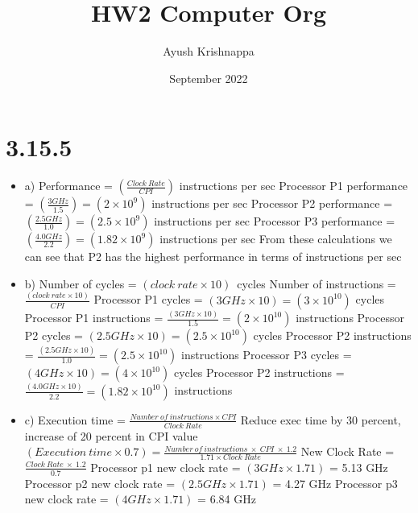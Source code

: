 \documentclass{article}
\title{HW2 Computer Org}
\author{Ayush Krishnappa}
\date{September 2022}
\begin{document}
\maketitle

\section{3.15.5}
\begin{itemize}
  \item a) Performance = $(\frac{Clock\ Rate}{CPI})$ instructions per sec\newline
  Processor P1 performance = $(\frac{3GHz}{1.5}) = (2 \times 10^9)$ instructions per sec\newline
  Processor P2 performance = $(\frac{2.5GHz}{1.0}) = (2.5 \times 10^9)$ instructions per sec\newline
  Processor P3 performance = $(\frac{4.0GHz}{2.2}) = (1.82 \times 10^9)$ instructions per sec\newline
  From these calculations we can see that P2 has the highest performance in terms of instructions per sec
  
  \item b) Number of cycles = $(clock\ rate \times 10)$\ cycles\newline
  Number of instructions = $\frac{(clock\ rate \times 10)}{CPI}$\newline
  Processor P1 cycles = $(3GHz \times 10) = (3 \times 10^{10})$ cycles\newline
  Processor P1 instructions = $\frac{(3GHz \times 10)}{1.5} = (2 \times 10^{10})$ instructions\newline
  Processor P2 cycles = $(2.5GHz \times 10) = (2.5 \times 10^{10})$ cycles\newline
  Processor P2 instructions = $\frac{(2.5GHz \times 10)}{1.0} = (2.5 \times 10^{10})$ instructions\newline
  Processor P3 cycles = $(4GHz \times 10) = (4 \times 10^{10})$ cycles\newline
  Processor P2 instructions = $\frac{(4.0GHz \times 10)}{2.2} = (1.82 \times 10^{10})$ instructions\newline
  
  \item c) Execution time = $\frac{Number\ of\ instructions \times CPI}{Clock\ Rate}$\newline
  Reduce exec time by 30 percent, increase of 20 percent in CPI value\newline
  $(Execution\ time \times 0.7) = \frac{Number\ of\ instructions\ \times \ CPI\ \times \ 1.2}{1.71 \times Clock\ Rate}$\newline
  New Clock Rate = $\frac{Clock\ Rate\ \times \ 1.2}{0.7}$\newline
  Processor p1 new clock rate = $(3GHz \times 1.71)$ = 5.13 GHz\newline
  Processor p2 new clock rate = $(2.5GHz \times 1.71)$ = 4.27 GHz\newline
  Processor p3 new clock rate = $(4GHz \times 1.71)$ = 6.84 GHz\newline
\end{itemize}
\end{document}
